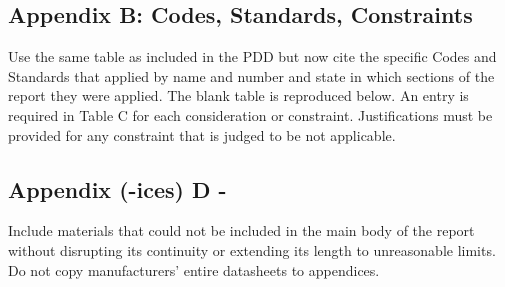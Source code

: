 \documentclass[12pt,a4paper]{report}
\begin{document}
\subsection{Appendix B: Codes, Standards, Constraints}
Use the same table as included in the PDD but now cite the specific Codes and Standards that applied by name and number and state in which sections of the report they were applied.  The blank table is reproduced below.  An entry is required in Table C for each consideration or constraint.  Justifications must be provided for any constraint that is judged to be not applicable.\\

\subsection{Appendix (-ices) D -} 
Include materials that could not be included in the main body of the report without disrupting its continuity or extending its length to unreasonable limits.  Do not copy manufacturers' entire datasheets to appendices.  
\end{document}
